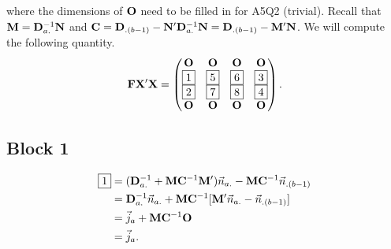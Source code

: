 where the dimensions of $ \mathbf{O} $ need to be filled in for A5Q2 (trivial).
Recall that $ \mathbf{M}=\mathbf{D}_{a.}^{-1}\mathbf{N} $ and $ \mathbf{C}=\mathbf{D}_{.(b-1)}-\mathbf{N}'\mathbf{D}_{a.}^{-1}\mathbf{N}=\mathbf{D}_{.(b-1)}-\mathbf{M}'\mathbf{N} $.
We will compute the following quantity.
\[ \mathbf{F}\mathbf{X}'\mathbf{X}
    =\begin{pmatrix}
        \mathbf{O} & \mathbf{O} & \mathbf{O} & \mathbf{O} \\
        \boxed{1}  & \boxed{5}  & \boxed{6}  & \boxed{3}  \\
        \boxed{2}  & \boxed{7}  & \boxed{8}  & \boxed{4}  \\
        \mathbf{O} & \mathbf{O} & \mathbf{O} & \mathbf{O}
    \end{pmatrix}. \]
\subsection*{Block 1}
\begin{align*}
    \boxed{1}
     & =(\mathbf{D}_{a.}^{-1}+\mathbf{M}\mathbf{C}^{-1}\mathbf{M}')\vec{n}_{a.}-\mathbf{M}\mathbf{C}^{-1}\vec{n}_{.(b-1)} \\
     & =\mathbf{D}_{a.}^{-1}\vec{n}_{a.}+\mathbf{M}\mathbf{C}^{-1}[\mathbf{M}'\vec{n}_{a.}-\vec{n}_{.(b-1)}]           \\
     & =\vec{j}_a+\mathbf{M}\mathbf{C}^{-1}\mathbf{O}                                                                        \\
     & =\vec{j}_a.
\end{align*}
